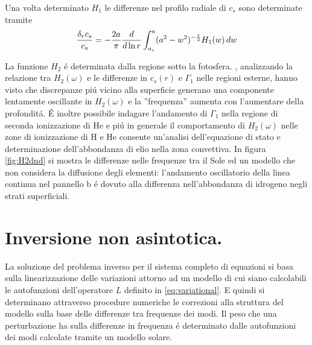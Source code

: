\documentclass[../main.tex]{subfiles}
\begin{document}
Una volta determinato $H_1$ le differenze nel profilo radiale di $c_s$ sono determinate tramite
\begin{equation}
\frac{\delta_rc_s}{c_s}=-\frac{2a}{\pi}\frac{d}{d \ln{r}}\int_{a_s}^a(a^2-w^2)^{-\frac{1}{2}}H_1(w)\,dw
\end{equation}


La funzione $H_2$ \'e determinata dalla regione sotto la fotosfera. \cite{chr92phase}, analizzando la relazione tra $H_2(\omega)$ e le differenze in $c_s(r)$ e $\Gamma_1$ nelle regioni esterne, hanno visto che discrepanze pi\'u vicino alla superficie generano una componente lentamente oscillante in $H_2(\omega)$ e la ''frequenza'' aumenta con l'aumentare della profondit\'a. \'E inoltre possibile indagare l'andamento di $\Gamma_1$ nella regione di seconda ionizzazione di He e pi\'u in generale il comportamento di $H_2(\omega)$ nelle zone di ionizzazione di H e He consente un'analisi dell'equazione di stato e determinazione dell'abbondanza di elio nella zona convettiva. In figura \ref{fig:H2dnd} si mostra le differenze nelle frequenze tra il Sole ed un modello che non considera la diffusione degli elementi: l'andamento oscillatorio della linea continua nel pannello b \'e dovuto alla differenza nell'abbondanza di idrogeno negli strati superficiali.



{\let\clearpage\relax\let\cleardoublepage\relax \chapter{Inversione non asintotica.}} %

La soluzione del problema inverso per il sistema completo di equazioni si basa sulla linearizzazione delle variazioni attorno ad un modello di cui siano calcolabili le autofunzioni dell'operatore $L$ definito in \eqref{eq:variational}. E quindi si determinano attraverso procedure numeriche le correzioni alla struttura del modello sulla base delle differenze tra frequenze dei modi. Il peso che una perturbazione ha sulla differenze in frequenza \'e determinato dalle autofunzioni dei modi calcolate tramite un modello solare.
\end{document}
